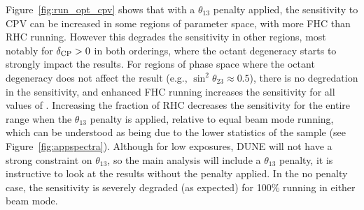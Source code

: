 Figure~\ref{fig:run_opt_cpv} shows that with a $\theta_{13}$ penalty applied, the sensitivity to CPV can be increased in some regions of \deltacp parameter space, with more FHC than RHC running. However this degrades the sensitivity in other regions, most notably for $\delta_{\rm CP} > 0$ in both orderings, where the octant degeneracy starts to strongly impact the results. For regions of phase space where the octant degeneracy does not affect the result (e.g., $\sin^{2}\theta_{23} \approx 0.5$), there is no degredation in the sensitivity, and enhanced FHC running increases the sensitivity for all values of \deltacp. Increasing the fraction of RHC decreases the sensitivity for the entire \deltacp range when the $\theta_{13}$ penalty is applied, relative to equal beam mode running, which can be understood as being due to the lower statistics of the \anue sample (see Figure~\ref{fig:appspectra}). Although for low exposures, DUNE will not have a strong constraint on $\theta_{13}$, so the main analysis will include a $\theta_{13}$ penalty, it is instructive to look at the results without the penalty applied. In the no penalty case, the sensitivity is severely degraded (as expected) for 100\% running in either beam mode.

